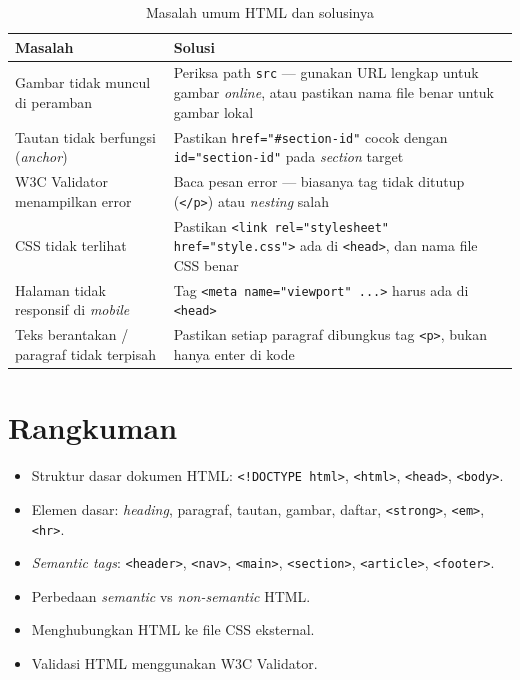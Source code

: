 \begin{table}[ht]
\centering
\caption{Masalah umum HTML dan solusinya}
\label{tab:m03-troubleshoot}
\small
\begin{tabular}{p{4.5cm}p{8cm}}
\toprule
\textbf{Masalah} & \textbf{Solusi} \\
\midrule
Gambar tidak muncul di peramban & Periksa path \texttt{src} --- gunakan URL lengkap untuk gambar \emph{online}, atau pastikan nama file benar untuk gambar lokal \\
Tautan tidak berfungsi (\emph{anchor}) & Pastikan \texttt{href="\#section-id"} cocok dengan \texttt{id="section-id"} pada \emph{section} target \\
W3C Validator menampilkan error & Baca pesan error --- biasanya tag tidak ditutup (\texttt{</p>}) atau \emph{nesting} salah \\
CSS tidak terlihat & Pastikan \texttt{<link rel="stylesheet" href="style.css">} ada di \texttt{<head>}, dan nama file CSS benar \\
Halaman tidak responsif di \emph{mobile} & Tag \texttt{<meta name="viewport" ...>} harus ada di \texttt{<head>} \\
Teks berantakan / paragraf tidak terpisah & Pastikan setiap paragraf dibungkus tag \texttt{<p>}, bukan hanya enter di kode \\
\bottomrule
\end{tabular}
\end{table}

\section{Rangkuman}
\label{sec:m03-rangkuman}

\begin{itemize}
  \item Struktur dasar dokumen HTML: \texttt{<!DOCTYPE html>}, \texttt{<html>}, \texttt{<head>}, \texttt{<body>}.
  \item Elemen dasar: \emph{heading}, paragraf, tautan, gambar, daftar, \texttt{<strong>}, \texttt{<em>}, \texttt{<hr>}.
  \item \emph{Semantic tags}: \texttt{<header>}, \texttt{<nav>}, \texttt{<main>}, \texttt{<section>}, \texttt{<article>}, \texttt{<footer>}.
  \item Perbedaan \emph{semantic} vs \emph{non-semantic} HTML.
  \item Menghubungkan HTML ke file CSS eksternal.
  \item Validasi HTML menggunakan W3C Validator.
\end{itemize}

